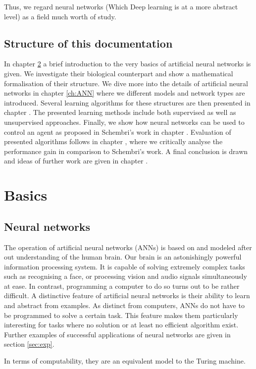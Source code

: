 \documentclass[10pt,a4paper,DIV=11]{scrreprt}
\begin{document}
Thus, we regard neural networks (Which Deep learning is at a more abstract level) as a field much worth of study.

\section{Structure of this documentation}
In chapter \ref{ch:basics} a brief introduction to the very basics of artificial neural networks is given. We investigate their biological counterpart
and show a mathematical formalisation of their structure. We dive more into the details of artificial neural networks in chapter \ref{ch:ANN} where
we different models and network types are introduced. Several learning algorithms for these structures are then presented in chapter \label{ch:learning}. 
The presented learning methods include both supervised as well as unsupervised approaches. Finally, we show how neural networks can be used to 
control an agent as proposed in Schembri's work in chapter \label{ch:design}. Evaluation of presented algorithms follows in chapter \label{ch:eval}, 
where we critically analyse the performance gain in comparison to Schembri's work. A final conclusion is drawn and ideas of further work are given
in chapter \label{ch:conclusion}.

\chapter{Basics}
\label{ch:basics}
\section{Neural networks}
The operation of artificial neural networks (ANNs) is based on and modeled after out understanding of the human brain. 
Our brain is an astonishingly powerful information processing system. It is capable of solving extremely complex tasks such as recognising a face, or
processing vision and audio signals simultaneously at ease. In contrast, programming a computer to do so turns out to be rather difficult.
A distinctive feature of artificial neural networks is their ability to learn and abstract from examples. As distinct from computers, 
ANNs do not have to be programmed to solve a certain task. This feature makes them particularly interesting for tasks where no solution or at 
least no efficient algorithm exist. Further examples of successful applications of neural networks are given in section \ref{sec:exp}.


In terms of computability, they are an equivalent model to the Turing machine.\cite{NURING}
\end{document}
